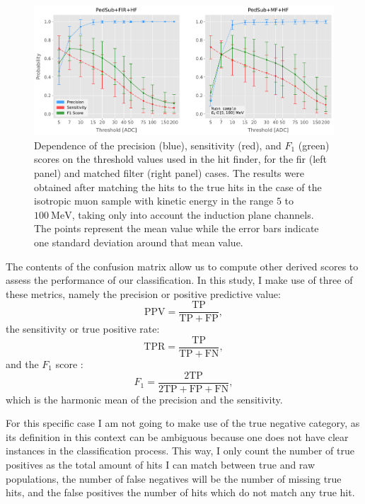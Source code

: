 \begin{figure}[t]
	\centering
	\includegraphics[width=.99\linewidth]{Images/Matched_Filter/hit_study_muon_scores_indct}
	\caption[Dependence of the precision, sensitivity, and $F_{1}$ scores on the threshold values used in the hit finder for the \gls{fir} and matched filters.]{Dependence of the precision (blue), sensitivity (red), and $F_{1}$ (green) scores on the threshold values used in the hit finder, for the \gls{fir} (left panel) and matched filter (right panel) cases. The results were obtained after matching the hits to the true hits in the case of the isotropic muon sample with kinetic energy in the range $5$ to $100 \ \mathrm{MeV}$, taking only into account the induction plane channels. The points represent the mean value while the error bars indicate one standard deviation around that mean value.}
	\label{fig:threshold_opt}
\end{figure}

The contents of the confusion matrix allow us to compute other derived scores to assess the performance of our classification. In this study, I make use of three of these metrics, namely the precision or positive predictive value:
\begin{equation}
	\mathrm{PPV} = \frac{\mathrm{TP}}{\mathrm{TP} + \mathrm{FP}},
\end{equation}
the sensitivity or true positive rate:
\begin{equation}
	\mathrm{TPR} = \frac{\mathrm{TP}}{\mathrm{TP} + \mathrm{FN}},
\end{equation}
and the $F_{1}$ score \cite{Taha2015}:
\begin{equation}
	F_{1} = \frac{\mathrm{2 TP}}{2\mathrm{TP} + \mathrm{FP} + \mathrm{FN}},
\end{equation}
which is the harmonic mean of the precision and the sensitivity.

For this specific case I am not going to make use of the true negative category, as its definition in this context can be ambiguous because one does not have clear instances in the classification process. This way, I only count the number of true positives as the total amount of hits I can match between true and raw populations, the number of false negatives will be the number of missing true hits, and the false positives the number of hits which do not match any true hit.

